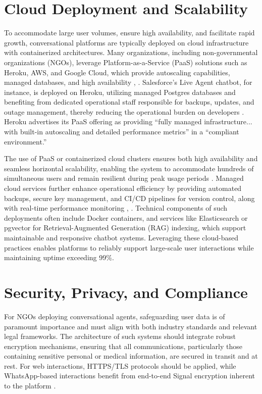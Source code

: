 \section{Cloud Deployment and Scalability}
To accommodate large user volumes, ensure high availability, and facilitate rapid growth, conversational platforms are typically deployed on cloud infrastructure with containerized architectures. Many organizations, including non-governmental organizations (NGOs), leverage Platform-as-a-Service (PaaS) solutions such as Heroku, AWS, and Google Cloud, which provide autoscaling capabilities, managed databases, and high availability \cite{heroku2024chatbots}, \cite{aws2024marketplace}. Salesforce’s Live Agent chatbot, for instance, is deployed on Heroku, utilizing managed Postgres databases and benefiting from dedicated operational staff responsible for backups, updates, and outage management, thereby reducing the operational burden on developers \cite{heroku2024chatbots}. Heroku advertises its PaaS offering as providing “fully managed infrastructure... with built-in autoscaling and detailed performance metrics” in a “compliant environment.”  

The use of PaaS or containerized cloud clusters ensures both high availability and seamless horizontal scalability, enabling the system to accommodate hundreds of simultaneous users and remain resilient during peak usage periods \cite{heroku2024chatbots}. Managed cloud services further enhance operational efficiency by providing automated backups, secure key management, and CI/CD pipelines for version control, along with real-time performance monitoring \cite{heroku2024chatbots}, \cite{aws2024marketplace}. Technical components of such deployments often include Docker containers, and services like Elasticsearch or pgvector for Retrieval-Augmented Generation (RAG) indexing, which support maintainable and responsive chatbot systems. Leveraging these cloud-based practices enables platforms to reliably support large-scale user interactions while maintaining uptime exceeding 99\%.

\section{Security, Privacy, and Compliance}
For NGOs deploying conversational agents, safeguarding user data is of paramount importance and must align with both industry standards and relevant legal frameworks. The architecture of such systems should integrate robust encryption mechanisms, ensuring that all communications, particularly those containing sensitive personal or medical information, are secured in transit and at rest. For web interactions, HTTPS/TLS protocols should be applied, while WhatsApp-based interactions benefit from end-to-end Signal encryption inherent to the platform \cite{whatsapp2024trust}.  

